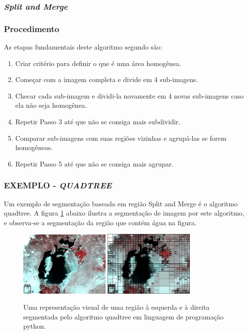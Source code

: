\subsubsection{\textit{Split and Merge}}
\subsubsection*{Procedimento}
As etapas fundamentais deste algoritmo segundo  são: 
\begin{enumerate}
    \item Criar critério para definir o que é uma área homogênea.
    \item Começar com a imagem completa e divide em 4 sub-imagens.
    \item Checar cada sub-imagem e dividi-la novamente em 4 novas sub-imagens caso ela não seja homogênea.
    \item Repetir Passo 3 até que não se consiga mais subdividir.
    \item Comparar sub-imagens com suas regiões vizinhas e agrupá-las se forem homogêneas.
    \item Repetir Passo 5 até que não se consiga mais agrupar.
\end{enumerate}

\subsubsection*{EXEMPLO - \textit{QUADTREE}}
Um exemplo de segmentação baseada em região Split and Merge é o algoritmo quadtree. A figura \ref{fig:aral} abaixo ilustra a segmentação de imagem por este algoritmo, e observa-se a segmentação da região que contém água na figura.

\begin{figure}[!htb]
 \centering
 \def\baselinestretch{1}\small\normalsize
 \includegraphics[width=0.4\textwidth]{img/stf-aral1997.jpg}\qquad
 \includegraphics[width=0.4\textwidth]{img/stf-aral1997-quadtree.jpg} 
 \caption{\label{fig:aral}Uma representação visual de uma região \citep{stanford} à esquerda e à direita segmentada pelo algoritmo quadtree em linguagem de programação python.}
\end{figure}

